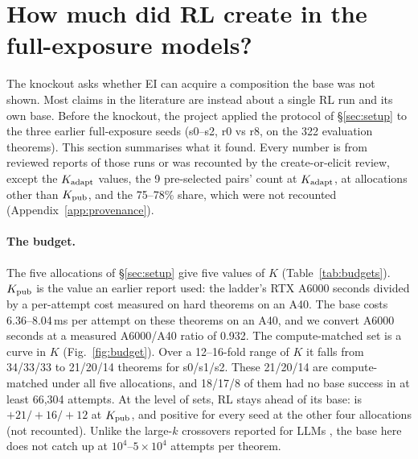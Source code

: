 \section{How much did RL create in the full-exposure models?}
\label{sec:case}

The knockout asks whether EI can acquire a composition the base was not shown. Most claims in the literature are
instead about a single RL run and its own base. Before the knockout, the project applied the protocol of
\S\ref{sec:setup} to the three earlier full-exposure seeds (s0--s2, r0 vs r8, on the 322 evaluation theorems). This
section summarises what it found. Every number is from reviewed reports of those runs or was recounted by the
create-or-elicit review, except the $K_{\mathrm{adapt}}$ values, the 9 pre-selected pairs' count at $K_{\mathrm{adapt}}$, \dcov{} at allocations other than
$K_{\mathrm{pub}}$, and the 75--78\% share, which were not recounted (Appendix~\ref{app:provenance}).

\paragraph{The budget.} The five allocations of \S\ref{sec:setup} give five values of $K$ (Table~\ref{tab:budgets}).
$K_{\mathrm{pub}}$ is the value an earlier report used: the ladder's RTX A6000 seconds divided by a per-attempt cost measured on
hard theorems on an A40. The base costs 6.36--8.04\,ms per attempt on these theorems on an A40, and we convert A6000 seconds at a
measured A6000/A40 ratio of 0.932. The compute-matched set is a curve in $K$ (Fig.~\ref{fig:budget}). Over a 12--16-fold
range of $K$ it falls from 34/33/33 to 21/20/14 theorems for s0/s1/s2. These 21/20/14 are compute-matched under all five
allocations, and 18/17/8 of them had no base success in at least 66,304 attempts. At the level of sets, RL stays ahead
of its base: \dcov{} is $+21/+16/+12$ at $K_{\mathrm{pub}}$, and positive for every seed at the other four allocations (not
recounted). Unlike the large-$k$ crossovers
reported for LLMs \citep{yue2025doesrl}, the base here does not catch up at $10^4$--$5\times10^4$ attempts per theorem.

